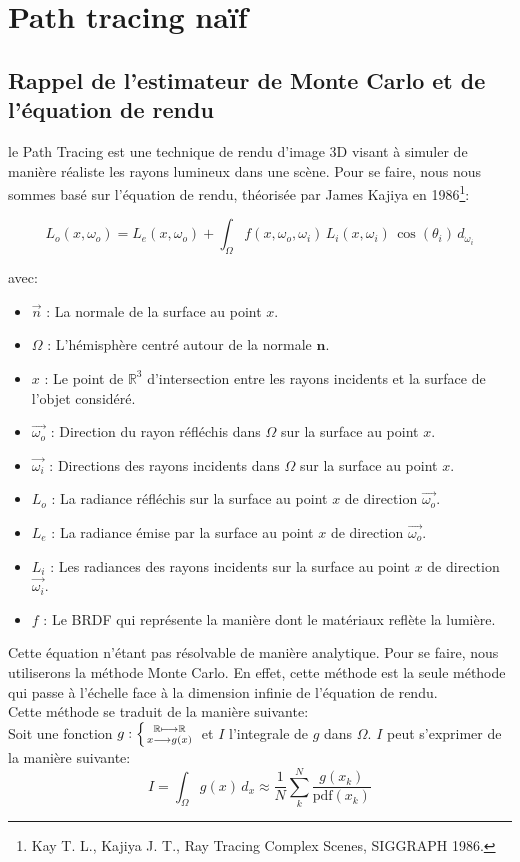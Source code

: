 \section{Path tracing naïf}

\subsection{Rappel de l'estimateur de Monte Carlo et de l'équation de rendu}

le Path Tracing est une technique de rendu d'image 3D visant à simuler de manière réaliste les rayons lumineux dans une scène. Pour se faire, nous nous sommes basé sur l'équation de rendu, théorisée par James Kajiya en 1986\footnote{Kay T. L., Kajiya J. T., Ray Tracing Complex Scenes, SIGGRAPH 1986.}:

$$\boxed{L_{o}(x, \omega_o) = L_{e}(x, \omega_o) + \int_{\Omega}f(x, \omega_o, \omega_i) \, L_{i}(x, \omega_i) \, \cos\left(\theta_i\right) \, d_{\omega_i}}$$

avec: 
\begin{itemize}
\item[$\_$] $\overrightarrow{n}$ : La normale de la surface au point $x$.
\item[$\_$] $\Omega$ : L'hémisphère centré autour de la normale $\textbf{n}$.
\item[$\_$] $x$ : Le point de $\mathbb{R}^3$ d'intersection entre les rayons incidents et la surface de l'objet considéré.
\item[$\_$] $\overrightarrow{\omega_o}$ : Direction du rayon réfléchis dans $\Omega$ sur la surface au point $x$.
\item[$\_$] $\overrightarrow{\omega_i}$ : Directions des rayons incidents dans $\Omega$ sur la surface au point $x$.
\item[$\_$] $L_o$ : La radiance réfléchis sur la surface au point $x$ de direction $\overrightarrow{\omega_o}$.
\item[$\_$] $L_e$ : La radiance émise par la surface au point $x$ de direction $\overrightarrow{\omega_o}$.
\item[$\_$] $L_i$ : Les radiances des rayons incidents sur la surface au point $x$ de direction $\overrightarrow{\omega_i}$.
\item[$\_$] $f$ : Le BRDF qui représente la manière dont le matériaux reflète la lumière.
\end{itemize}
\vspace{5mm}

Cette équation n'étant pas résolvable de manière analytique. Pour se faire, nous utiliserons la méthode Monte Carlo. En effet, cette méthode est la seule méthode qui passe à l'échelle face à la dimension infinie de l'équation de rendu.\\
Cette méthode se traduit de la manière suivante:\\
Soit une fonction $g:\left\{\mathbb{R} \longmapsto \mathbb{R}\atop x\longrightarrow g(x)\right.$ et $I$ l'integrale de $g$ dans $\Omega$. $I$ peut s'exprimer de la manière suivante:
$$
I = \int_\Omega g(x) \, d_x \approx \frac{1}{N} \sum_k^N \frac{g(x_k)}{\text{pdf}(x_k)}
$$

